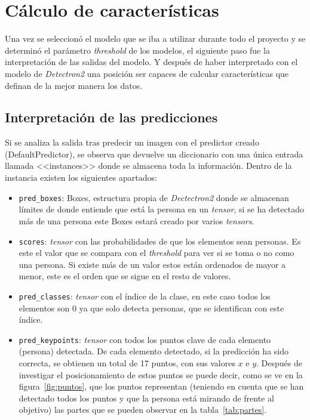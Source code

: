 {\section{Cálculo de características}
Una vez se seleccionó el modelo que se iba a utilizar durante todo el proyecto y se determinó el parámetro \textit{threshold} de los modelos, el siguiente paso fue la interpretación de las salidas del modelo. Y después de haber interpretado con el modelo de \textit{Detectron2} una posición ser capaces de calcular características que definan de la mejor manera los datos.
\subsection{Interpretación de las predicciones}
Si se analiza la salida tras predecir un imagen con el predictor creado (DefaultPredictor), se observa que devuelve un diccionario con una única entrada llamada <<instances>> donde se almacena toda la información. Dentro de la instancia existen los siguientes apartados:
\begin{itemize}
	\item \texttt{pred\_boxes}: Boxes, estructura propia de \textit{Dectectron2} donde se almacenan límites de donde entiende que está la persona en un \textit{tensor}, si se ha detectado más de una persona este Boxes estará creado por varios \textit{tensors}.
	\item \texttt{scores}: \textit{tensor} con las probabilidades de que los elementos sean personas. Es este el valor que se compara con el \textit{threshold} para ver si se toma o no como una persona. Si existe más de un valor estos están ordenados de mayor a menor, este es el orden que se sigue en el resto de valores.
	\item \texttt{pred\_classes}: \textit{tensor} con el índice de la clase, en este caso todos los elementos son 0 ya que solo detecta personas, que se identifican con este índice.
	\item \texttt{pred\_keypoints}: \textit{tensor} con todos los puntos clave de cada elemento (persona) detectada. De cada elemento detectado, si la predicción ha sido correcta, se obtienen un total de 17 puntos, con sus valores $x$ e $y$. Después de investigar el posicionamiento de estos puntos se puede decir, como se ve en la figura~\ref{fig:puntos}, que los puntos representan (teniendo en cuenta que se han detectado todos los puntos y que la persona está mirando de frente al objetivo) las partes que se pueden observar en la tabla~\ref{tab:partes}.
\end{itemize}

}

